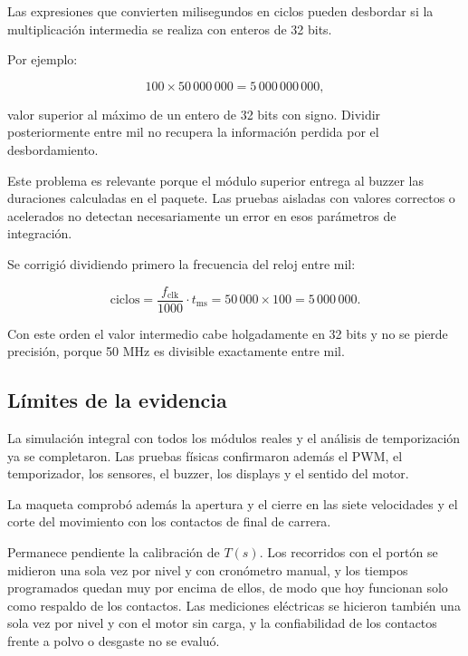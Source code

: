 \documentclass[12pt,letterpaper]{article}
\begin{document}
Las expresiones que convierten milisegundos en ciclos
pueden desbordar si la multiplicación intermedia se
realiza con enteros de 32 bits.

Por ejemplo:

\begin{equation}
100 \times 50\,000\,000
=5\,000\,000\,000,
\end{equation}

valor superior al máximo de un entero de 32 bits
con signo. Dividir posteriormente entre mil no recupera
la información perdida por el desbordamiento.

Este problema es relevante porque el módulo superior
entrega al buzzer las duraciones calculadas en el paquete.
Las pruebas aisladas con valores correctos o acelerados
no detectan necesariamente un error en esos parámetros
de integración.

Se corrigió dividiendo primero la frecuencia del reloj
entre mil:

\begin{equation}
\text{ciclos} = \frac{f_{\mathrm{clk}}}{1000}\cdot t_{\mathrm{ms}}
= 50\,000 \times 100 = 5\,000\,000.
\end{equation}

Con este orden el valor intermedio cabe holgadamente en
32 bits y no se pierde precisión, porque 50 MHz es
divisible exactamente entre mil.

\subsection{Límites de la evidencia}

La simulación integral con todos los módulos reales y el
análisis de temporización ya se completaron. Las pruebas
físicas confirmaron además el PWM, el temporizador, los
sensores, el buzzer, los displays y el sentido del motor.

La maqueta comprobó además la apertura y el cierre en
las siete velocidades y el corte del movimiento con los
contactos de final de carrera.

Permanece pendiente la calibración de $T(s)$. Los
recorridos con el portón se midieron una sola vez por
nivel y con cronómetro manual, y los tiempos programados
quedan muy por encima de ellos, de modo que hoy funcionan
solo como respaldo de los contactos. Las mediciones
eléctricas se hicieron también una sola vez por nivel y
con el motor sin carga, y la confiabilidad de los
contactos frente a polvo o desgaste no se evaluó.
\end{document}
